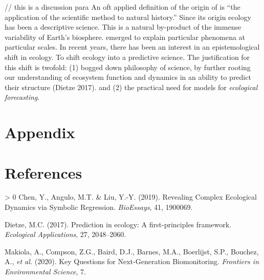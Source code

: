 \documentclass[10pt,oneside]{article}
\newlength{\cslhangindent}
\newenvironment{CSLReferences}[3] %
 {%
  \setlength{\parindent}{0pt}
  \ifodd #1 \everypar{\setlength{\hangindent}{\cslhangindent}}\ignorespaces\fi
  \ifnum #2 > 0
  \setlength{\parskip}{#2\baselineskip}
  \fi
 }%
 {}
\begin{document}
// this is a discussion para An oft applied definition of the origin of
is ``the application of the scientific method to natural history.''
Since its origin ecology has been a descriptive science. This is a
natural by-product of the immense variability of Earth's biosphere.
emerged to explain particular phenomena at particular scales. In recent
years, there has been an interest in an epistemological shift in
ecology. To shift ecology into a predictive science. The justification
for this shift is twofold: (1) bogged down philosophy of science, by
further rooting our understanding of ecosystem function and dynamics in
an ability to predict their structure (Dietze 2017). and (2) the
practical need for models for \emph{ecological forecasting}.

\hypertarget{appendix}{%
\section{Appendix}\label{appendix}}

\hypertarget{references}{%
\section*{References}\label{references}}

\hypertarget{refs}{}
\begin{CSLReferences}{1}{0}
\leavevmode\hypertarget{ref-Chen2019RevCom}{}%
Chen, Y., Angulo, M.T. \& Liu, Y.-Y. (2019). Revealing Complex
Ecological Dynamics via Symbolic Regression. \emph{BioEssays}, 41,
1900069.

\leavevmode\hypertarget{ref-Dietze2017PreEco}{}%
Dietze, M.C. (2017). Prediction in ecology: A first-principles
framework. \emph{Ecological Applications}, 27, 2048--2060.

\leavevmode\hypertarget{ref-Makiola2020KeyQue}{}%
Makiola, A., Compson, Z.G., Baird, D.J., Barnes, M.A., Boerlijst, S.P.,
Bouchez, A., \emph{et al.} (2020). Key Questions for Next-Generation
Biomonitoring. \emph{Frontiers in Environmental Science}, 7.

\end{CSLReferences}
\end{document}
